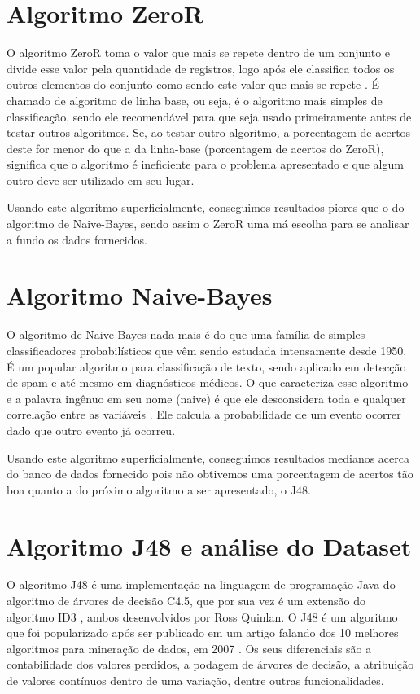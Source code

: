 \documentclass[12pt]{article}
\begin{document}
\section{Algoritmo ZeroR}

O algoritmo ZeroR toma o valor que mais se repete dentro de um conjunto e divide esse valor pela quantidade de registros, logo após ele classifica todos os outros elementos do conjunto como sendo este valor que mais se repete \cite{ZeroR:67}. É chamado de algoritmo de linha base, ou seja, é o algoritmo mais simples de classificação, sendo ele recomendável para que seja usado primeiramente antes de testar outros algoritmos. Se, ao testar outro algoritmo, a porcentagem de acertos deste for menor do que a da linha-base (porcentagem de acertos do ZeroR), significa que o algoritmo é ineficiente para o problema apresentado e que algum outro deve ser utilizado em seu lugar.

Usando este algoritmo superficialmente, conseguimos resultados piores que o do algoritmo de Naive-Bayes, sendo assim o ZeroR uma má escolha para se analisar a fundo os dados fornecidos.

\section{Algoritmo Naive-Bayes}
O algoritmo de Naive-Bayes nada mais é do que uma família de simples classificadores probabilísticos que vêm sendo estudada intensamente desde 1950. É um popular algoritmo para classificação de texto, sendo aplicado em detecção de spam e até mesmo em diagnósticos médicos. O que caracteriza esse algoritmo e a palavra ingênuo em seu nome (naive) é que ele desconsidera toda e qualquer correlação entre as variáveis \cite{Organica:35}. Ele calcula a probabilidade de um evento ocorrer dado que outro evento já ocorreu.

Usando este algoritmo superficialmente, conseguimos resultados medianos acerca do banco de dados fornecido pois não obtivemos uma porcentagem de acertos tão boa quanto a do próximo algoritmo a ser apresentado, o J48.


\section{Algoritmo J48 e análise do Dataset}
O algoritmo J48 é uma implementação na linguagem de programação Java do algoritmo de árvores de decisão C4.5, que por sua vez é um extensão do algoritmo ID3 , ambos desenvolvidos por Ross Quinlan. O J48 é um algoritmo que foi popularizado após ser publicado em um artigo falando dos 10 melhores algoritmos para mineração de dados, em 2007 \cite{Top:10}. Os seus diferenciais são a contabilidade dos valores perdidos, a podagem de árvores de decisão, a atribuição de valores contínuos dentro de uma variação, dentre outras funcionalidades.
\end{document}
